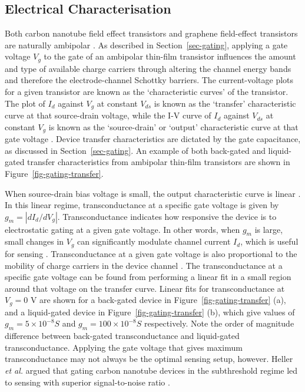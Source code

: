 \documentclass[
  a4paper,
]{scrbook}
\begin{document}
\hypertarget{electrical-characterisation}{%
\subsection{Electrical
Characterisation}\label{electrical-characterisation}}

Both carbon nanotube field effect transistors and graphene field-effect
transistors are naturally ambipolar \autocite{Avouris2007,Heller2009a}.
As described in Section~\ref{sec-gating}, applying a gate voltage
\(V_g\) to the gate of an ambipolar thin-film transistor influences the
amount and type of available charge carriers through altering the
channel energy bands and therefore the electrode-channel Schottky
barriers. The current-voltage plots for a given transistor are known as
the `characteristic curves' of the transistor. The plot of \(I_d\)
against \(V_g\) at constant \(V_{ds}\) is known as the `transfer'
characteristic curve at that source-drain voltage, while the I-V curve
of \(I_d\) against \(V_{ds}\) at constant \(V_g\) is known as the
`source-drain' or `output' characteristic curve at that gate voltage
\autocite{Sze2006}. Device transfer characteristics are dictated by the
gate capacitance, as discussed in Section~\ref{sec-gating}. An example
of both back-gated and liquid-gated transfer characteristics from
ambipolar thin-film transistors are shown in
Figure~\ref{fig-gating-transfer}.

When source-drain bias voltage is small, the output characteristic curve
is linear \autocite{Avouris2007}. In this linear regime,
transconductance at a specific gate voltage is given by
\(g_m = |dI_{d}/dV_g|\). Transconductance indicates how responsive the
device is to electrostatic gating at a given gate voltage. In other
words, when \(g_m\) is large, small changes in \(V_g\) can significantly
modulate channel current \(I_d\), which is useful for sensing
\autocite{Heller2009a}. Transconductance at a given gate voltage is also
proportional to the mobility of charge carriers in the device channel
\autocite{Zheng2017,Li2023}. The transconductance at a specific gate
voltage can be found from performing a linear fit in a small region
around that voltage on the transfer curve. Linear fits for
transconductance at \(V_g = 0\) V are shown for a back-gated device in
Figure~\ref{fig-gating-transfer} (a), and a liquid-gated device in
Figure~\ref{fig-gating-transfer} (b), which give values of
\(g_m = 5 \times 10^{-8} S\) and \(g_m = 100 \times 10^{-8} S\)
respectively. Note the order of magnitude difference between back-gated
transconductance and liquid-gated transconductance. Applying the gate
voltage that gives maximum transconductance may not always be the
optimal sensing setup, however. Heller \emph{et al.} argued that gating
carbon nanotube devices in the subthreshold regime led to sensing with
superior signal-to-noise ratio \autocite{Heller2009}.
\end{document}
